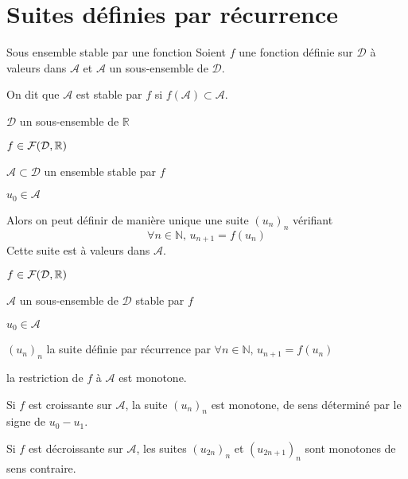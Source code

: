 \section{Suites définies par récurrence}

    \begin{defi}{Sous ensemble stable par une fonction}{}
        Soient $f$ une fonction définie sur $\mathcal{D}$ à valeurs dans $\mathcal{A}$ et $\mathcal{A}$ un sous-ensemble de $\mathcal{D}$.

        On dit que $\mathcal{A}$ est stable par $f$ si $f(\mathcal{A}) \subset \mathcal{A}$.
    \end{defi}

    \begin{theo}{}{}
        \begin{soient}
            \item $\mathcal{D}$ un sous-ensemble de $\mathbb{R}$
            \item $f \in \mathcal{F}(\mathcal{D},\mathbb{R})$
            \item $\mathcal{A} \subset \mathcal{D}$ un ensemble stable par $f$
            \item $u_0 \in \mathcal{A}$
        \end{soient}
        Alors on peut définir de manière unique une suite $(u_n)_n$ vérifiant 
        \[ \forall n \in \mathbb{N}, \, u_{n+1} = f(u_n) \] 
        Cette suite est à valeurs dans $ \mathcal{A}$.
    \end{theo}

    \begin{prop}{}{}
        \begin{soient}
            \item $f \in \mathcal{F}(\mathcal{D},\mathbb{R})$
            \item $\mathcal{A}$ un sous-ensemble de $\mathcal{D}$ stable par $f$
            \item $u_0 \in \mathcal{A}$
            \item $(u_n)_n$ la suite définie par récurrence par $\forall n \in \mathbb{N}, \, u_{n+1} = f(u_n)$
        \end{soient}
        \begin{suppose}
            \item la restriction de $f$ à $\mathcal{A}$ est monotone.
        \end{suppose}
        \begin{alors}
            \item Si $f$ est croissante sur $\mathcal{A}$, la suite $(u_n)_n$ est monotone, de sens déterminé par le signe de $u_0-u_1$.
            \item Si $f$ est décroissante sur $\mathcal{A}$, les suites $(u_{2n})_n$ et $(u_{2n+1})_n$ sont monotones de sens contraire.
        \end{alors}
    \end{prop}

